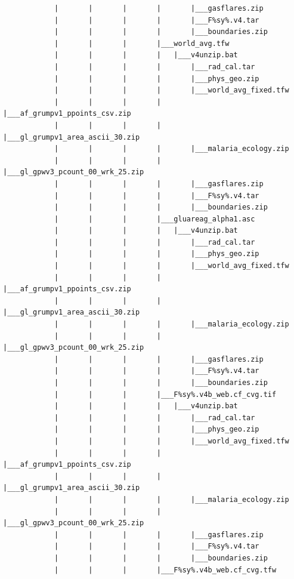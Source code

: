 \documentclass[]{book}
\begin{document}
\begin{verbatim}
            |       |       |       |       |___gasflares.zip
            |       |       |       |       |___F%sy%.v4.tar
            |       |       |       |       |___boundaries.zip
            |       |       |       |___world_avg.tfw
            |       |       |       |   |___v4unzip.bat
            |       |       |       |       |___rad_cal.tar
            |       |       |       |       |___phys_geo.zip
            |       |       |       |       |___world_avg_fixed.tfw
            |       |       |       |       |___af_grumpv1_ppoints_csv.zip
            |       |       |       |       |___gl_grumpv1_area_ascii_30.zip
            |       |       |       |       |___malaria_ecology.zip
            |       |       |       |       |___gl_gpwv3_pcount_00_wrk_25.zip
            |       |       |       |       |___gasflares.zip
            |       |       |       |       |___F%sy%.v4.tar
            |       |       |       |       |___boundaries.zip
            |       |       |       |___gluareag_alpha1.asc
            |       |       |       |   |___v4unzip.bat
            |       |       |       |       |___rad_cal.tar
            |       |       |       |       |___phys_geo.zip
            |       |       |       |       |___world_avg_fixed.tfw
            |       |       |       |       |___af_grumpv1_ppoints_csv.zip
            |       |       |       |       |___gl_grumpv1_area_ascii_30.zip
            |       |       |       |       |___malaria_ecology.zip
            |       |       |       |       |___gl_gpwv3_pcount_00_wrk_25.zip
            |       |       |       |       |___gasflares.zip
            |       |       |       |       |___F%sy%.v4.tar
            |       |       |       |       |___boundaries.zip
            |       |       |       |___F%sy%.v4b_web.cf_cvg.tif
            |       |       |       |   |___v4unzip.bat
            |       |       |       |       |___rad_cal.tar
            |       |       |       |       |___phys_geo.zip
            |       |       |       |       |___world_avg_fixed.tfw
            |       |       |       |       |___af_grumpv1_ppoints_csv.zip
            |       |       |       |       |___gl_grumpv1_area_ascii_30.zip
            |       |       |       |       |___malaria_ecology.zip
            |       |       |       |       |___gl_gpwv3_pcount_00_wrk_25.zip
            |       |       |       |       |___gasflares.zip
            |       |       |       |       |___F%sy%.v4.tar
            |       |       |       |       |___boundaries.zip
            |       |       |       |___F%sy%.v4b_web.cf_cvg.tfw

\end{verbatim}
\end{document}
